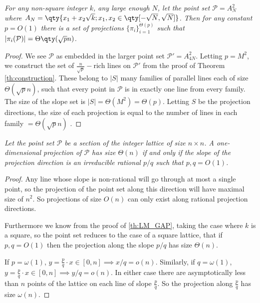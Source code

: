 \documentclass[11pt]{article}
\newcommand{\pts}{\mathcal P}
\begin{document}
$\qquad$\\
\emph{For any non-square integer $k$, any large enough $N$, let the point set $\pts=A_N^2$ where $A_N = \qty{ x_1 + x_2 \sqrt{k} ; x_1,x_2 \in \qty[-\sqrt{N},\sqrt{N}]}$. Then for any constant $p=O(1)$ there is a set of projections $\big\{ \pi_i \}_{i=1}^{\Theta(p)}$ such that $|\pi_i(\pts) | = \Theta \qty( \sqrt{p} n)$.
}

\begin{proof}
We see $\pts$ as embedded in the larger point set $\pts' = A_{4N}^2$. Letting $p=M^2$, we construct the set of $\frac{n}{\sqrt{p}}-$rich lines on $\pts'$ from the proof of Theorem \ref{th:construction}. These belong to $|S|$ many families of parallel lines each of size $\Theta(\sqrt{p}n)$, such that every point in $\pts$ is in exactly one line from every family. The size of the slope set is $|S|=\Theta(M^2)=\Theta(p)$. Letting $S$ be the projection directions, the size of each projection is equal to the number of lines in each family $= \Theta(\sqrt{p}n)$ .
\end{proof}


$\qquad$\\
\emph{Let the point set $\pts$ be a section of the integer lattice of size $n \times n$. A one-dimensional projection  of $\pts$ has size $\Theta(n)$ if and only if the slope of the projection direction is an irreducible rational $p/q$ such that $p,q=O(1)$.
}


\begin{proof}
Any line whose slope is non-rational will go through at most a single point, so the projection of the point set along this direction will have maximal size of $n^2$. So projections of size $O(n)$ can only exist along rational projection directions. 

Furthermore we know from the proof of \ref{th:LM_GAP}, taking the case where $k$ is a square, so the point set reduces to the case of a square lattice, that if $p,q=O(1)$ then the projection along the slope $p/q$ has size $\Theta(n)$. 

If $p = \omega(1)$, $y=\frac{p}{q} \cdot x \in [0,n] \implies x/q = o(n)$. Similarly, if $q = \omega(1)$, $y=\frac{p}{q} \cdot x \in [0,n] \implies y/q = o(n)$. In either case there are asymptotically less than $n$ points of the lattice on each line of slope $\frac{p}{q}$. So the projection along $\frac{p}{q}$ has size $\omega(n)$.


\end{proof}
\end{document}
